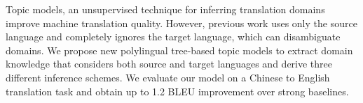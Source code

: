 Topic models, an unsupervised technique for inferring translation domains improve machine translation quality. However, previous work uses only the source language and completely ignores the target language, which can disambiguate domains. We propose new polylingual tree-based topic models to extract domain knowledge that considers both source and target languages and derive three different inference schemes. We evaluate our model on a Chinese to English translation task and obtain up to 1.2 BLEU improvement over strong baselines.
